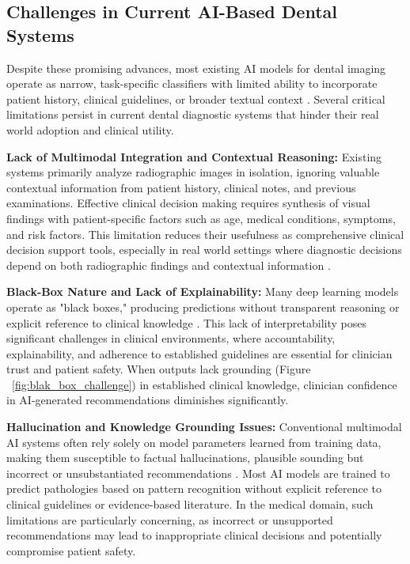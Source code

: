 \documentclass[12pt,a4paper]{report}
\begin{document}
	
	\subsection{Challenges in Current AI-Based Dental Systems}
	
	Despite these promising advances, most existing AI models for dental imaging operate as narrow, task-specific classifiers with limited ability to incorporate patient history, clinical guidelines, or broader textual context \cite{peerj2024caries}. Several critical limitations persist in current dental diagnostic systems that hinder their real world adoption and clinical utility.
	
	\textbf{Lack of Multimodal Integration and Contextual Reasoning:} Existing systems primarily analyze radiographic images in isolation, ignoring valuable contextual information from patient history, clinical notes, and previous examinations. Effective clinical decision making requires synthesis of visual findings with patient-specific factors such as age, medical conditions, symptoms, and risk factors. This limitation reduces their usefulness as comprehensive clinical decision support tools, especially in real world settings where diagnostic decisions depend on both radiographic findings and contextual information \cite{White01121999}.
	
	\textbf{Black-Box Nature and Lack of Explainability:} Many deep learning models operate as "black boxes," producing predictions without transparent reasoning or explicit reference to clinical knowledge \cite{holzinger2017we}. This lack of interpretability poses significant challenges in clinical environments, where accountability, explainability, and adherence to established guidelines are essential for clinician trust and patient safety. When outputs lack grounding (Figure ~\ref{fig:blak_box_challenge}) in established clinical knowledge, clinician confidence in AI-generated recommendations diminishes significantly.
	
	\textbf{Hallucination and Knowledge Grounding Issues:} Conventional multimodal AI systems often rely solely on model parameters learned from training data, making them susceptible to factual hallucinations, plausible sounding but incorrect or unsubstantiated recommendations \cite{ji2023survey}. Most AI models are trained to predict pathologies based on pattern recognition without explicit reference to clinical guidelines or evidence-based literature. In the medical domain, such limitations are particularly concerning, as incorrect or unsupported recommendations may lead to inappropriate clinical decisions and potentially compromise patient safety.
	
\end{document}
